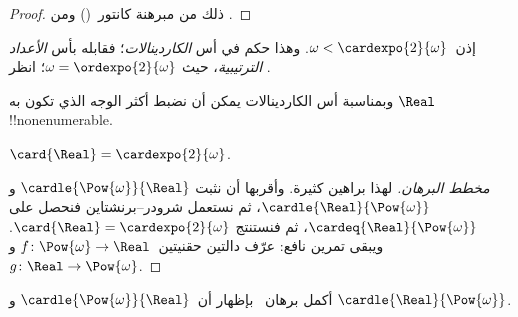 \documentclass[../../../include/open-logic-section]{subfiles}
\begin{document}
\begin{proof}
ذلك من مبرهنة كانتور~() ومن
.
\end{proof}
\noindent
إذن~$\omega < \cardexpo{2}{\omega}$. وهذا حكم في أس
\emph{الكاردينالات}؛ فقابله بأس \emph{الأعداد الترتيبية}، حيث
$\omega = \ordexpo{2}{\omega}$؛ انظر
.

وبمناسبة أس الكاردينالات يمكن أن نضبط أكثر الوجه الذي تكون به
$\Real$ !!{nonenumerable}.

\begin{thm}
$\card{\Real} = \cardexpo{2}{\omega}$.
\end{thm}

\begin{proof}[مخطط البرهان]
لهذا براهين كثيرة. وأقربها أن نثبت
$\cardle{\Pow{\omega}}{\Real}$ و$\cardle{\Real}{\Pow{\omega}}$، ثم
نستعمل شرودر--برنشتاين فنحصل على
$\cardeq{\Real}{\Pow{\omega}}$، ثم
 فنستنتج
$\card{\Real} = \cardexpo{2}{\omega}$. ويبقى تمرين نافع: عرّف
دالتين حقنيتين~$f \colon \Pow{\omega} \to \Real$ و
$g \colon \Real \to \Pow{\omega}$.
\end{proof}

\begin{prob}
أكمل برهان~ بإظهار
أن~$\cardle{\Pow{\omega}}{\Real}$ و
$\cardle{\Real}{\Pow{\omega}}$.
\end{prob}
\end{document}
